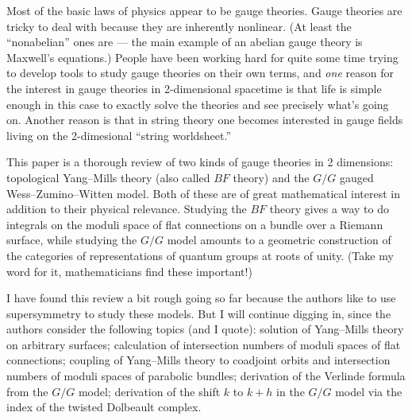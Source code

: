 \documentclass[12pt]{article}
\def\tightlist{}
\renewcommand{\texttt}[1]{%
  \begingroup
  \ttfamily
  \begingroup\lccode`~=`/\lowercase{\endgroup\def~}{/\discretionary{}{}{}}%
  \begingroup\lccode`~=`[\lowercase{\endgroup\def~}{[\discretionary{}{}{}}%
  \begingroup\lccode`~=`.\lowercase{\endgroup\def~}{.\discretionary{}{}{}}%
  \catcode`/=\active\catcode`[=\active\catcode`.=\active
  \scantokens{#1\noexpand}%
  \endgroup
}
\begin{document}

Most of the basic laws of physics appear to be gauge theories. Gauge
theories are tricky to deal with because they are inherently nonlinear.
(At least the ``nonabelian'' ones are --- the main example of an abelian
gauge theory is Maxwell's equations.) People have been working hard for
quite some time trying to develop tools to study gauge theories on their
own terms, and \emph{one} reason for the interest in gauge theories in
2-dimensional spacetime is that life is simple enough in this case to
exactly solve the theories and see precisely what's going on. Another
reason is that in string theory one becomes interested in gauge fields
living on the 2-dimesional ``string worldsheet.''

This paper is a thorough review of two kinds of gauge theories in 2
dimensions: topological Yang--Mills theory (also called \(BF\) theory)
and the \(G/G\) gauged Wess--Zumino--Witten model. Both of these are of
great mathematical interest in addition to their physical relevance.
Studying the \(BF\) theory gives a way to do integrals on the moduli
space of flat connections on a bundle over a Riemann surface, while
studying the \(G/G\) model amounts to a geometric construction of the
categories of representations of quantum groups at roots of unity. (Take
my word for it, mathematicians find these important!)

I have found this review a bit rough going so far because the authors
like to use supersymmetry to study these models. But I will continue
digging in, since the authors consider the following topics (and I
quote): solution of Yang--Mills theory on arbitrary surfaces; calculation
of intersection numbers of moduli spaces of flat connections; coupling
of Yang--Mills theory to coadjoint orbits and intersection numbers of
moduli spaces of parabolic bundles; derivation of the Verlinde formula
from the \(G/G\) model; derivation of the shift \(k\) to \(k+h\) in the
\(G/G\) model via the index of the twisted Dolbeault complex.

\end{document}
